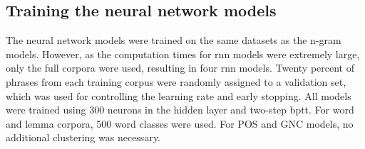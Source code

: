\FloatBarrier
\subsection{Training the neural network models}
The neural network models were trained on the same datasets as the n-gram models. However, as the computation times for \gls{rnn} models were extremely large, only the full corpora were used, resulting in four \gls{rnn} models. Twenty percent of phrases from each training corpus were randomly assigned to a validation set, which was used for controlling the learning rate and early stopping. All models were trained using 300 neurons in the hidden layer and two-step \gls{bptt}. For word and lemma corpora, 500 word classes were used. For POS and GNC models, no additional clustering was necessary.
